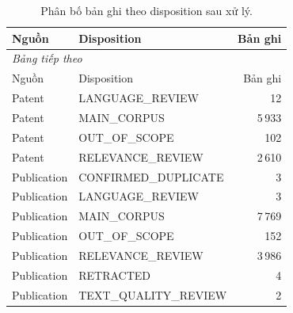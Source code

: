 \begingroup\small\setlength{\tabcolsep}{4pt}\renewcommand{\arraystretch}{1.16}
\begin{longtable}{llr}
\caption{Phân bố bản ghi theo disposition sau xử lý.}\label{tab:cleaning}\\
\toprule Nguồn & Disposition & Bản ghi \\
\midrule\endfirsthead
\multicolumn{3}{l}{\textit{Bảng tiếp theo}}\\
\toprule Nguồn & Disposition & Bản ghi \\
\midrule\endhead
\bottomrule\endfoot
Patent & LANGUAGE\_REVIEW & 12 \\
Patent & MAIN\_CORPUS & 5\,933 \\
Patent & OUT\_OF\_SCOPE & 102 \\
Patent & RELEVANCE\_REVIEW & 2\,610 \\
Publication & CONFIRMED\_DUPLICATE & 3 \\
Publication & LANGUAGE\_REVIEW & 3 \\
Publication & MAIN\_CORPUS & 7\,769 \\
Publication & OUT\_OF\_SCOPE & 152 \\
Publication & RELEVANCE\_REVIEW & 3\,986 \\
Publication & RETRACTED & 4 \\
Publication & TEXT\_QUALITY\_REVIEW & 2 \\
\end{longtable}\endgroup
{}
